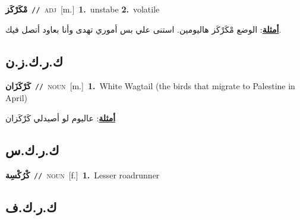 \documentclass[10pt,a4paper,twoside]{article} %
\begin{document}
\begin{multicols}{2}
{\setlength\topsep{0pt}\textbf{\foreignlanguage{arabic}{مْكَرْكَز}}\ {\color{gray}\texttt{//}\color{black}}\ \textsc{adj}\ [m.]\ \textbf{1.}~unstabe  \textbf{2.}~volatile\  \begin{flushright}\color{gray}\foreignlanguage{arabic}{\textbf{\underline{\foreignlanguage{arabic}{أمثلة}}}: الوضع مْكَرْكَز هاليومين. استنى علي بس أموري تهدى وأنا بعاود أتصل فيك.}\end{flushright}\color{black}} \vspace{2mm}

\vspace{-3mm}
\subsection*{\color{blue}\foreignlanguage{arabic}{ك.ر.ك.ز.ن}\color{blue}{ (ntws)}} 

{\setlength\topsep{0pt}\textbf{\foreignlanguage{arabic}{كَرْكَزَان}}\ {\color{gray}\texttt{//}\color{black}}\ \textsc{noun}\ [m.]\ \textbf{1.}~White Wagtail (the birds that migrate to Palestine in April)\  \begin{flushright}\color{gray}\foreignlanguage{arabic}{\textbf{\underline{\foreignlanguage{arabic}{أمثلة}}}: عاليوم لو أصيدلي كَرْكَزان}\end{flushright}\color{black}} \vspace{2mm}

\vspace{-3mm}
\subsection*{\color{blue}\foreignlanguage{arabic}{ك.ر.ك.س}\color{blue}{ (ntws)}} 

{\setlength\topsep{0pt}\textbf{\foreignlanguage{arabic}{كْرُكْسِة}}\ {\color{gray}\texttt{//}\color{black}}\ \textsc{noun}\ [f.]\ \textbf{1.}~Lesser roadrunner\ } \vspace{2mm}

\vspace{-3mm}
\subsection*{\color{blue}\foreignlanguage{arabic}{ك.ر.ك.ف}\color{blue}{}} 


\end{multicols}
\end{document}
